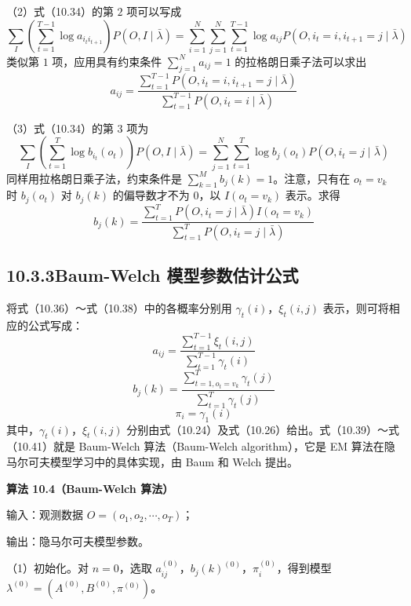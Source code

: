 \documentclass[UTF8, 12pt, fontset=fandol, oneside]{ctexart}
\begin{document}
（2）式（10.34）的第 $2$ 项可以写成
\[
  \sum_I\left(\sum_{t=1}^{T-1}\log a_{i_t i_{t+1}}\right)P(O,I\mid\bar\lambda)
  =
  \sum_{i=1}^N\sum_{j=1}^N\sum_{t=1}^{T-1}\log a_{ij}P(O,i_t=i,i_{t+1}=j\mid\bar\lambda)
\]
类似第 $1$ 项，应用具有约束条件 $\sum_{j=1}^N a_{ij}=1$ 的拉格朗日乘子法可以求出
\begin{equation}
  a_{ij}=
  \frac{\sum_{t=1}^{T-1}P(O,i_t=i,i_{t+1}=j\mid\bar\lambda)}
  {\sum_{t=1}^{T-1}P(O,i_t=i\mid\bar\lambda)}
  \tag{10.37}
\end{equation}

（3）式（10.34）的第 $3$ 项为
\[
  \sum_I\left(\sum_{t=1}^{T}\log b_{i_t}(o_t)\right)P(O,I\mid\bar\lambda)
  =
  \sum_{j=1}^N\sum_{t=1}^{T}\log b_j(o_t)P(O,i_t=j\mid\bar\lambda)
\]
同样用拉格朗日乘子法，约束条件是 $\sum_{k=1}^M b_j(k)=1$。注意，只有在 $o_t=v_k$ 时 $b_j(o_t)$ 对 $b_j(k)$ 的偏导数才不为 $0$，以 $I(o_t=v_k)$ 表示。求得
\begin{equation}
  b_j(k)=
  \frac{\sum_{t=1}^{T}P(O,i_t=j\mid\bar\lambda)I(o_t=v_k)}
  {\sum_{t=1}^{T}P(O,i_t=j\mid\bar\lambda)}
  \tag{10.38}
\end{equation}

\subsection*{10.3.3\quad Baum-Welch 模型参数估计公式}

将式（10.36）～式（10.38）中的各概率分别用 $\gamma_t(i)$，$\xi_t(i,j)$ 表示，则可将相应的公式写成：
\begin{equation}
  a_{ij}=\frac{\sum_{t=1}^{T-1}\xi_t(i,j)}{\sum_{t=1}^{T-1}\gamma_t(i)}
  \tag{10.39}
\end{equation}
\begin{equation}
  b_j(k)=\frac{\sum_{t=1,o_t=v_k}^{T}\gamma_t(j)}{\sum_{t=1}^{T}\gamma_t(j)}
  \tag{10.40}
\end{equation}
\begin{equation}
  \pi_i=\gamma_1(i)
  \tag{10.41}
\end{equation}
其中，$\gamma_t(i)$，$\xi_t(i,j)$ 分别由式（10.24）及式（10.26）给出。式（10.39）～式（10.41）就是 Baum-Welch 算法（Baum-Welch algorithm），它是 EM 算法在隐马尔可夫模型学习中的具体实现，由 Baum 和 Welch 提出。

\noindent\textbf{算法 10.4（Baum-Welch 算法）}\quad

输入：观测数据 $O=(o_1,o_2,\cdots,o_T)$；

输出：隐马尔可夫模型参数。

（1）初始化。对 $n=0$，选取 $a_{ij}^{(0)}$，$b_j(k)^{(0)}$，$\pi_i^{(0)}$，得到模型 $\lambda^{(0)}=(A^{(0)},B^{(0)},\pi^{(0)})$。
\end{document}
